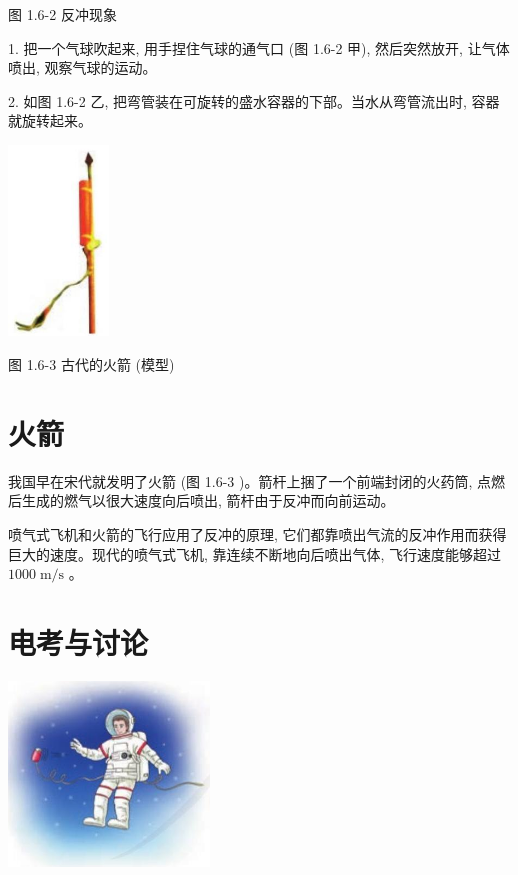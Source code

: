 \documentclass[10pt]{article}
\begin{document}
图 1.6-2 反冲现象

1. 把一个气球吹起来, 用手捏住气球的通气口 (图 1.6-2 甲), 然后突然放开, 让气体喷出, 观察气球的运动。

2. 如图 1.6-2 乙, 把弯管装在可旋转的盛水容器的下部。当水从弯管流出时, 容器就旋转起来。

\begin{center}
\includegraphics[max width=0.2\textwidth]{images/01910e4c-ebb8-7d2c-8f2f-2375bc1d2d12_31_142858.jpg}
\end{center}

图 1.6-3 古代的火箭 (模型)

\section*{火箭}

我国早在宋代就发明了火箭 (图 1.6-3 )。箭杆上捆了一个前端封闭的火药筒, 点燃后生成的燃气以很大速度向后喷出, 箭杆由于反冲而向前运动。

喷气式飞机和火箭的飞行应用了反冲的原理, 它们都靠喷出气流的反冲作用而获得巨大的速度。现代的喷气式飞机, 靠连续不断地向后喷出气体, 飞行速度能够超过 \({1000}\mathrm{\;m}/\mathrm{s}\) 。

\section*{电考与讨论}

\begin{center}
\includegraphics[max width=0.4\textwidth]{images/01910e4c-ebb8-7d2c-8f2f-2375bc1d2d12_31_480295.jpg}
\end{center}
\end{document}
